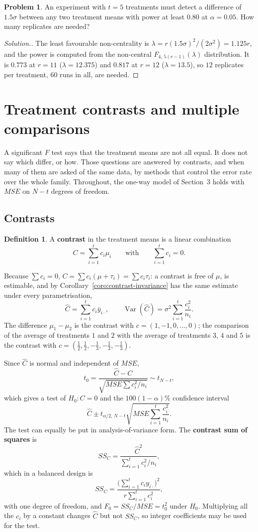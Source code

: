 \documentclass[11pt,a4paper]{article}
\numberwithin{equation}{section}
\DeclareMathOperator{\Var}{Var}
\theoremstyle{definition}
\newtheorem{defn}[thm]{Definition}
\newtheorem{problemx}{Problem}[subsection]
\newenvironment{problem}{\begin{problemx}}{\end{problemx}}
\newenvironment{solution}
  {\renewcommand{\qedsymbol}{}\begin{proof}[\textit{Solution}.]}
  {\end{proof}}
\begin{document}
\begin{problem}
An experiment with $t = 5$ treatments must detect a difference of $1.5\sigma$ between any two treatment means with power at least $0.80$ at $\alpha = 0.05$. How
many replicates are needed?
\end{problem}

\begin{solution}
The least favourable non-centrality is $\lambda = r(1.5\sigma)^2/(2\sigma^2) = 1.125r$, and the power is computed from the non-central $F_{4,\,5(r-1)}(\lambda)$ distribution. It is
$0.773$ at $r = 11$ ($\lambda = 12.375$) and $0.817$ at $r = 12$ ($\lambda = 13.5$), so $12$ replicates per treatment, $60$ runs in all, are needed.
\end{solution}

\section{Treatment contrasts and multiple comparisons}
A significant $F$ test says that the treatment means are not all equal. It does not say which differ, or how. Those questions are answered by
contrasts, and when many of them are asked of the same data, by methods that control the error rate over the whole family. Throughout, the
one-way model of Section~3 holds with $MSE$ on $N - t$ degrees of freedom.

\subsection{Contrasts}
\begin{defn}
A \textbf{contrast} in the treatment means is a linear combination
\[
C = \sum_{i=1}^tc_i\mu_i \qquad\text{with}\qquad \sum_{i=1}^tc_i = 0 .
\]
\end{defn}

Because $\sum c_i = 0$, $C = \sum c_i(\mu + \tau_i) = \sum c_i\tau_i$: a contrast is free of $\mu$, is estimable, and by Corollary~\ref{coro:contrast-invariance} has the same estimate
under every parametrisation,
\[
\hat C = \sum_{i=1}^tc_i\bar y_{i\cdot} , \qquad \Var(\hat C) = \sigma^2\sum_{i=1}^t\frac{c_i^2}{n_i} .
\]
The difference $\mu_1 - \mu_2$ is the contrast with $c = (1, -1, 0, \dots, 0)$; the comparison of the average of treatments $1$ and $2$ with the average of
treatments $3$, $4$ and $5$ is the contrast with $c = (\frac12, \frac12, -\frac13, -\frac13, -\frac13)$.

Since $\hat C$ is normal and independent of $MSE$,
\[
t_0 = \frac{\hat C - C}{\sqrt{MSE\sum c_i^2/n_i}} \sim t_{N-t} ,
\]
which gives a test of $H_0 : C = 0$ and the $100(1 - \alpha)\%$ confidence interval
\[
\hat C \pm t_{\alpha/2,\,N-t}\sqrt{MSE\sum_{i=1}^t\frac{c_i^2}{n_i}} .
\]
The test can equally be put in analysis-of-variance form. The \textbf{contrast sum of squares} is
\[
SS_C = \frac{\hat C^2}{\sum_{i=1}^tc_i^2/n_i} ,
\]
which in a balanced design is
\[
SS_C = \frac{\bigl(\sum_{i=1}^tc_iy_{i\cdot}\bigr)^2}{r\sum_{i=1}^tc_i^2} ,
\]
with one degree of freedom, and $F_0 = SS_C/MSE = t_0^2$ under $H_0$. Multiplying all the $c_i$ by a constant changes $\hat C$ but not $SS_C$, so integer
coefficients may be used for the test.
\end{document}
